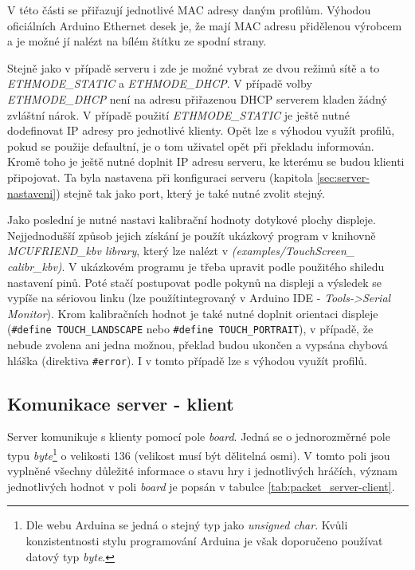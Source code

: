 V této části se přiřazují jednotlivé MAC adresy daným profilům. Výhodou oficiálních Arduino Ethernet desek je, že mají MAC adresu přidělenou výrobcem a je možné jí nalézt na bílém štítku ze spodní strany.


Stejně jako v případě serveru i zde je možné vybrat ze dvou režimů sítě a to \textit{ETHMODE\_STATIC} a \textit{ETHMODE\_DHCP}. V případě volby \textit{ETHMODE\_DHCP} není na adresu přiřazenou DHCP serverem kladen žádný zvláštní nárok. V případě použití \textit{ETHMODE\_STATIC} je ještě nutné dodefinovat IP adresy pro jednotlivé klienty. Opět lze s výhodou využít profilů, pokud se použije defaultní, je o tom uživatel opět při překladu informován.
Kromě toho je ještě nutné doplnit IP adresu serveru, ke kterému se budou klienti připojovat. Ta byla nastavena při konfiguraci serveru (kapitola \ref{sec:server-nastaveni}) stejně tak jako port, který je také nutné zvolit stejný.


Jako poslední je nutné nastavi kalibrační hodnoty dotykové plochy displeje. Nejjednodušší způsob jejich získání je použít ukázkový program v knihovně \textit{MCUFRIEND\_kbv library}, který lze nalézt  v \textit{(examples/TouchScreen\_
calibr\_kbv)}. V ukázkovém programu je třeba upravit podle použitého shiledu nastavení pinů. Poté stačí postupovat podle pokynů na displeji a výsledek se vypíše na sériovou linku (lze použítintegrovaný v Arduino IDE - \textit{Tools->Serial Monitor}). Krom kalibračních hodnot je také nutné doplnit orientaci displeje (\texttt{\#define TOUCH\_LANDSCAPE} nebo \texttt{\#define TOUCH\_PORTRAIT}), v případě, že nebude zvolena ani jedna možnou, překlad budou ukončen a vypsána chybová hláška (direktiva \texttt{\#error}). I v tomto případě lze s výhodou využít profilů.


\subsection{Komunikace server - klient}
\label{sec:comm_server-client}
Server komunikuje s klienty pomocí pole \textit{board}. Jedná se o jednorozměrné pole typu \textit{byte}\footnote{Dle webu Arduina \cite{ard_unsignedChar} se jedná o stejný typ jako \textit{unsigned char}. Kvůli konzistentnosti stylu programování Arduina je však doporučeno používat datový typ \textit{byte}.} o velikosti 136 (velikost musí být dělitelná osmi). V tomto poli jsou vyplněné všechny důležité informace o stavu hry i jednotlivých hráčích, význam jednotlivých hodnot v poli \textit{board} je popsán v tabulce \ref{tab:packet_server-client}.

